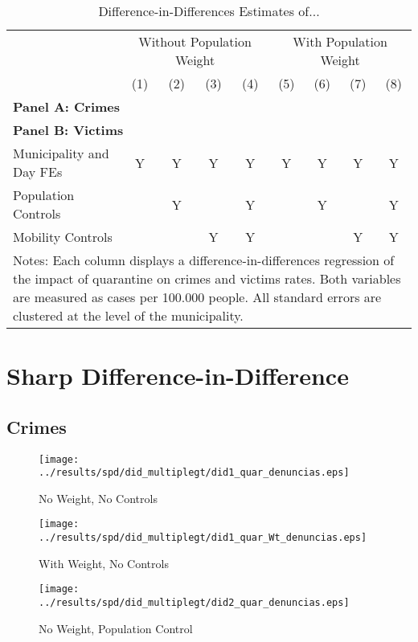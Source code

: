 \documentclass[11pt,letterpaper]{article}
\begin{document}
\begin{landscape}
  \begin{table}
    \centering
    \caption{Difference-in-Differences Estimates of...} \label{tab:DD}
    \begin{tabular}{lcccccccc} \toprule
      &\multicolumn{4}{c}{Without Population Weight}&\multicolumn{4}{c}{With Population Weight} \\ 
      \cmidrule(r){2-5}\cmidrule(r){6-9}
      &(1)&(2)&(3)&(4)&(5)&(6)&(7)&(8) \\ \midrule
      \multicolumn{9}{l}{\textbf{Panel A: Crimes}} \\
       \midrule
      \multicolumn{9}{l}{\textbf{Panel B: Victims}} \\
      
      \midrule
      Municipality and Day FEs &Y&Y&Y&Y&Y&Y&Y&Y \\
      Population Controls      & &Y& &Y& &Y& &Y \\
      Mobility Controls        & & &Y&Y& & &Y&Y \\
      \bottomrule
      \multicolumn{9}{p{21.8cm}}{{\footnotesize Notes: Each column displays a difference-in-differences regression of the impact of quarantine on crimes and victims rates. Both variables are measured as cases per 100.000 people.  All standard errors are clustered at the level of the municipality.}}
    \end{tabular}
  \end{table}
\end{landscape}

\section{Sharp Difference-in-Difference}
	\subsection{Crimes}
\begin{figure}[H]
\caption{No Weight, No Controls}
\centering
\texttt{[image: ../results/spd/did\_multiplegt/did1\_quar\_denuncias.eps]}
\end{figure}

\begin{figure}[H]
\caption{With Weight, No Controls}
\centering
\texttt{[image: ../results/spd/did\_multiplegt/did1\_quar\_Wt\_denuncias.eps]}
\end{figure}
\begin{figure}[H]
\caption{No Weight, Population Control}
\centering
\texttt{[image: ../results/spd/did\_multiplegt/did2\_quar\_denuncias.eps]}
\end{figure}
\end{document}
